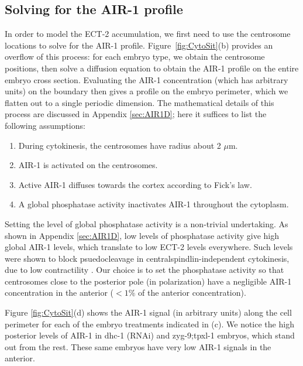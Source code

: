 \documentclass[11pt]{article}
\begin{document}
\subsection{Solving for the AIR-1 profile}
In order to model the ECT-2 accumulation, we first need to use the centrosome locations to solve for the AIR-1 profile. Figure\ \ref{fig:CytoSit}(b) provides an overflow of this process: for each embryo type, we obtain the centrosome positions, then solve a diffusion equation to obtain the AIR-1 profile on the entire embryo cross section. Evaluating the AIR-1 concentration (which has arbitrary units) on the boundary then gives a profile on the embryo perimeter, which we flatten out to a single periodic dimension. The mathematical details of this process are discussed in Appendix \ref{sec:AIR1D}; here it suffices to list the following assumptions:
\begin{enumerate}
\item During cytokinesis, the centrosomes have radius about 2 $\mu$m.
\item AIR-1 is activated on the centrosomes.
\item Active AIR-1 diffuses towards the cortex according to Fick's law.
\item A global phosphatase activity inactivates AIR-1 throughout the cytoplasm. 
\end{enumerate}
Setting the level of global phosphatase activity is a non-trivial undertaking. As shown in Appendix \ref{sec:AIR1D}, low levels of phosphatase activity give high global AIR-1 levels, which translate to low ECT-2 levels everywhere. Such levels were shown to block psuedocleavage in centralspindlin-independent cytokinesis, due to low contractility \cite{afshar2010regulation, kotak2016aurora}. Our choice is to set the phosphatase activity so that centrosomes close to the posterior pole (in polarization) have a negligible AIR-1 concentration in the anterior ($< 1\%$ of the anterior concentration).

Figure \ref{fig:CytoSit}(d) shows the AIR-1 signal (in arbitrary units) along the cell perimeter for each of the embryo treatments indicated in (c). We notice the high posterior levels of AIR-1 in dhc-1 (RNAi) and zyg-9;tpxl-1 embryos, which stand out from the rest. These same embryos have very low AIR-1 signals in the anterior. 
\end{document}
